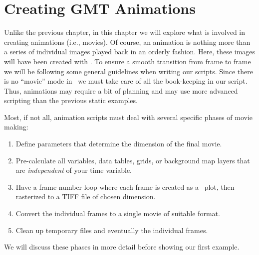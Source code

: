 %
%
\chapter{Creating GMT Animations}
\label{ch:8}
\thispagestyle{headings}

Unlike the previous chapter, in this chapter we will explore
what is involved in creating animations (i.e., movies).  Of course,
an animation is nothing more than a series of individual images
played back in an orderly fashion.  Here, these images will have
been created with \GMT.  To ensure a smooth transition from frame
to frame we will be following some general guidelines when writing
our scripts.  Since there is no ``movie'' mode in \GMT\ we must take
care of all the book-keeping in our script.  Thus, animations may
require a bit of planning and may use more advanced scripting than the
previous static examples.

Most, if not all, animation scripts must deal with several specific
phases of movie making:
\begin{enumerate}
	\item Define parameters that determine the dimension of the final movie.
	\item Pre-calculate all variables, data tables, grids, or background
	map layers that are \emph{independent} of your time variable.
	\item Have a frame-number loop where each frame is created as a \PS\ plot,
	then rasterized to a TIFF file of chosen dimension.
	\item Convert the individual frames to a single movie of suitable format.
	\item Clean up temporary files and eventually the individual frames.
\end{enumerate}

We will discuss these phases in more detail before showing our first example.

